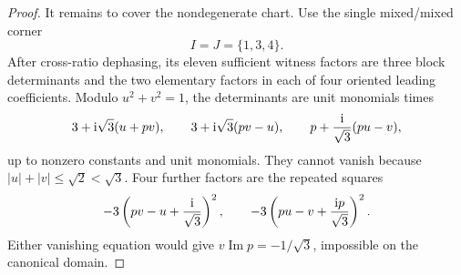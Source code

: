 \begin{proof}
It remains to cover the nondegenerate chart.  Use the single mixed/mixed corner
\begin{equation}
I=J=\{1,3,4\}.
\label{eq:supp-karlsson-fixed-corner}
\end{equation}
After cross-ratio dephasing, its eleven sufficient witness factors are three block determinants and the two elementary factors in each of four oriented leading coefficients.  Modulo $u^2+v^2=1$, the determinants are unit monomials times
\begin{equation}
3+\mathrm i\sqrt3(u+pv),\qquad
3+\mathrm i\sqrt3(pv-u),\qquad
p+\frac{\mathrm i}{\sqrt3}(pu-v),
\label{eq:supp-karlsson-determinants}
\end{equation}
up to nonzero constants and unit monomials. They cannot vanish because $|u|+|v|\leq\sqrt2<\sqrt3$. Four further factors are the repeated squares
\begin{equation}
-3\left(pv-u+\frac{\mathrm i}{\sqrt3}\right)^2,\qquad
-3\left(pu-v+\frac{\mathrm i p}{\sqrt3}\right)^2.
\label{eq:supp-karlsson-squares}
\end{equation}
Either vanishing equation would give $v\operatorname{Im}p=-1/\sqrt3$, impossible on the canonical domain.


\end{proof}
